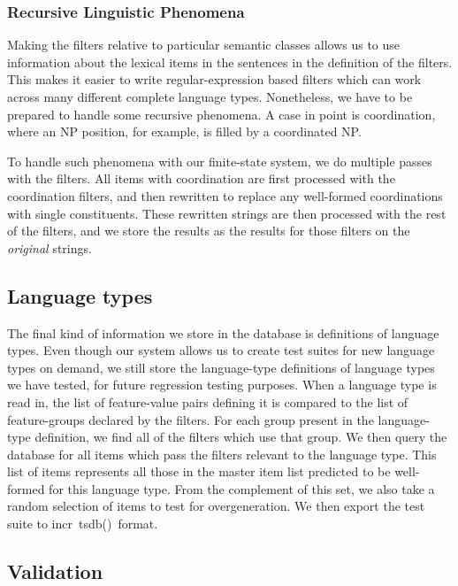 \documentclass[11pt]{article}
\newcommand{\itsdb}{\mbox{\sf \lbrack incr tsdb()\rbrack}}
\begin{document}
\subsubsection{Recursive Linguistic Phenomena}

Making the filters relative to particular semantic classes
allows us to use information about the lexical items in 
the sentences in the definition of the filters.  This makes
it easier to write regular-expression based filters which
can work across many different complete language types. Nonetheless,
we have to be prepared to handle some recursive phenomena.
A case in point is coordination, where an NP position, for example,
is filled by a coordinated NP.  

To handle such phenomena with our finite-state system, we do multiple
passes with the filters.  All items with coordination are first processed
with the coordination filters, and then rewritten to replace any
well-formed coordinations with single constituents.  These rewritten
strings are then processed with the rest of the filters, and we store
the results as the results for those filters on the {\it original}
strings.

\subsection{Language types}

The final kind of information we store in the database is definitions
of language types.  Even though our system allows us to create test
suites for new language types on demand, we still store the
language-type definitions of language types we have tested, for future
regression testing purposes.  When a language type is read in, the
list of feature-value pairs defining it is compared to the list of
feature-groups declared by the filters.  For each group present in the
language-type definition, we find all of the filters which use that
group.  We then query the database for all items which pass the
filters relevant to the language type.  This list of items represents
all those in the master item list predicted to be well-formed for
this language type.  From the complement of this set, we also take
a random selection of items to test for overgeneration.  We then export
the test suite to \itsdb\ format.

\subsection{Validation}
\end{document}
